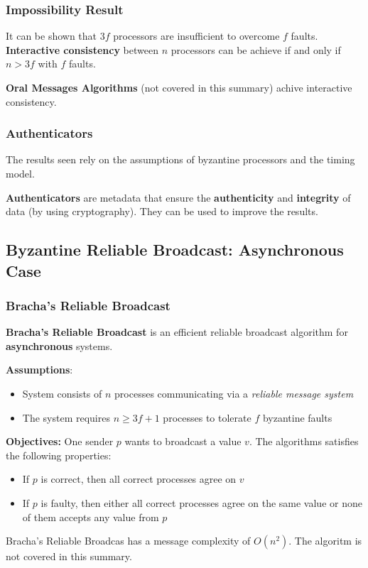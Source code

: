 \documentclass[12pt,A4]{extarticle}
\newcommand{\highlight}[1]{\textcolor{highlightColor}{\textbf{#1}}}
\begin{document}
\subsubsection{Impossibility Result}
It can be shown that $3f$ processors are insufficient to overcome $f$ faults. \textbf{Interactive consistency} between $n$ processors can be achieve if and only if $n > 3f$ with $f$ faults.\par
\textbf{Oral Messages Algorithms} (not covered in this summary) achive interactive consistency.

\subsubsection{Authenticators}
The results seen rely on the assumptions of byzantine processors and the timing model.\par
\highlight{Authenticators} are metadata that ensure the \textbf{authenticity} and \textbf{integrity} of data (by using cryptography). They can be used to improve the results.

\subsection{Byzantine Reliable Broadcast: Asynchronous Case}
\subsubsection{Bracha's Reliable Broadcast}
\highlight{Bracha's Reliable Broadcast} \cite{BRACHA1987130} is an efficient reliable broadcast algorithm for \textbf{asynchronous} systems.\par
\textbf{Assumptions}:
\begin{itemize}
  \item{System consists of $n$ processes communicating via a \textit{reliable message system}}
  \item{The system requires $n \geq 3f + 1$ processes to tolerate $f$ byzantine faults}
\end{itemize}
\textbf{Objectives:} One sender $p$ wants to broadcast a value $v$. The algorithms satisfies the following properties:
\begin{itemize}
  \item{If $p$ is correct, then all correct processes agree on $v$}
  \item{If $p$ is faulty, then either all correct processes agree on the same value or none of them accepts any value from $p$}
\end{itemize}
Bracha's Reliable Broadcas has a message complexity of $O(n^2)$. The algoritm is not covered in this summary.

\newpage


\end{document}
